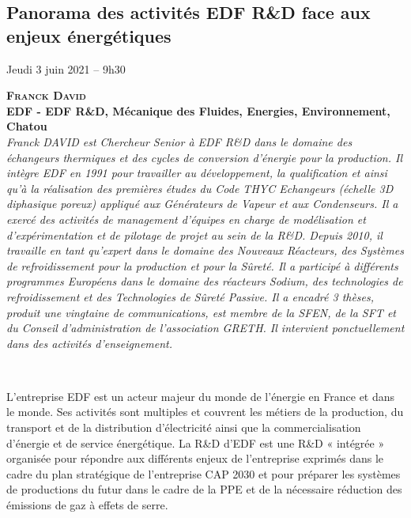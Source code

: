 \clearpage
{}\subsection*{Panorama des activités EDF R\&D face aux enjeux énergétiques}
%
\begin{center}
Jeudi 3 juin 2021 -- 9h30
\end{center}

\hspace{0.04\linewidth}\vrule\hspace{0.01\linewidth}\parbox{0.88\linewidth}{
\textbf{{\scshape Franck David}\\ EDF - EDF R\&D, Mécanique des Fluides, Energies, Environnement, Chatou}\\
{\slshape Franck DAVID est Chercheur Senior à EDF R\&D dans le domaine des échangeurs thermiques et des cycles de conversion d’énergie pour la production. Il intègre EDF en 1991 pour travailler au développement, la qualification et ainsi qu’à la réalisation des premières études du Code THYC Echangeurs (échelle 3D diphasique poreux) appliqué aux Générateurs de Vapeur et aux Condenseurs. Il a exercé des activités de management d’équipes en charge de modélisation et d’expérimentation et de pilotage de projet au sein de la R\&D. Depuis 2010, il travaille en tant qu’expert dans le domaine des Nouveaux Réacteurs, des Systèmes de refroidissement pour la production et pour la Sûreté. Il a participé à différents programmes Européens dans le domaine des réacteurs Sodium, des technologies de refroidissement et des Technologies de Sûreté Passive. Il a encadré 3 thèses, produit une vingtaine de communications, est membre de la SFEN, de la SFT  et du Conseil d’administration de l’association GRETH. Il intervient ponctuellement dans des activités d’enseignement.}}\\[2ex]

\vspace{1cm}

L'entreprise EDF est un acteur majeur du monde de l'énergie en France et dans le monde. Ses activités sont multiples et couvrent les métiers de la production, du transport et de la distribution d'électricité ainsi que la commercialisation d'énergie et de service énergétique. La R\&D d’EDF est une R\&D « intégrée » organisée pour répondre aux différents enjeux de l'entreprise exprimés dans le cadre du plan stratégique de l'entreprise CAP 2030 et pour préparer les systèmes de productions du futur dans le cadre de la PPE et de la nécessaire réduction des émissions de gaz à effets de serre.

